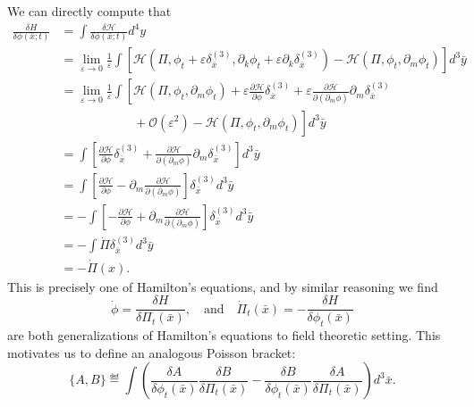 We can directly compute that
\begin{subequations}
\begin{align}
\frac{\delta H}{\delta\phi(\bar{x};t)} &= \int \frac{\delta\mathcal{H}}{\delta\phi(\bar{x};t)}d^{4}y\\
&= \lim_{\varepsilon\to0}\frac{1}{\varepsilon}\int\left[\mathcal{H}(\Pi,\phi_{t}+\varepsilon\delta^{(3)}_{\bar{x}},\partial_{k}\phi_{t}+\varepsilon\partial_{k}\delta^{(3)}_{\bar{x}})-\mathcal{H}(\Pi,\phi_{t},\partial_{m}\phi_{t})\right]d^{3}\bar{y}\\
&=\lim_{\varepsilon\to0}\frac{1}{\varepsilon}\int\left[\mathcal{H}(\Pi,\phi_{t},\partial_{m}\phi_{t})+\varepsilon\frac{\partial\mathcal{H}}{\partial\phi}\delta_{\bar{x}}^{(3)}+\varepsilon\frac{\partial\mathcal{H}}{\partial(\partial_{m}\phi)}\partial_{m}\delta_{\bar{x}}^{(3)}\right.\\\nonumber
&\left.\phantom{\lim_{\varepsilon\to0}\frac{1}{\varepsilon}\int\qquad}
+\mathcal{O}(\varepsilon^{2})-\mathcal{H}(\Pi,\phi_{t},\partial_{m}\phi_{t})\right]d^{3}\bar{y}\\
&=\int\left[\frac{\partial\mathcal{H}}{\partial\phi}\delta^{(3)}_{\bar{x}}+\frac{\partial\mathcal{H}}{\partial(\partial_{m}\phi)}\partial_{m}\delta^{(3)}_{\bar{x}}\right]d^{3}\bar{y}\\
&=\int\left[\frac{\partial\mathcal{H}}{\partial\phi}-\partial_{m}\frac{\partial\mathcal{H}}{\partial(\partial_{m}\phi)}\right]\delta^{(3)}_{\bar{x}}d^{3}\bar{y}\\
&=-\int\left[-\frac{\partial\mathcal{H}}{\partial\phi}+\partial_{m}\frac{\partial\mathcal{H}}{\partial(\partial_{m}\phi)}\right]\delta^{(3)}_{\bar{x}}d^{3}\bar{y}\\
&=-\int\dot{\Pi}\delta^{(3)}_{\bar{x}}d^{3}\bar{y}\\
&=-\dot{\Pi}(x).
\end{align}
\end{subequations}
This is precisely one of Hamilton's equations, and by similar
reasoning we find
\begin{equation}%
\dot{\phi} = \frac{\delta
  H}{\delta\Pi_{t}(\bar{x})},\quad\text{and}\quad\dot{\Pi}_{t}(\bar{x})=-\frac{\delta H}{\delta\phi_{t}(\bar{x})}
\end{equation}
are both generalizations of Hamilton's equations to field
theoretic setting. This motivates us to define an analogous
Poisson bracket:
\begin{equation}%
\{A,B\}\eqdef\int\left(\frac{\delta A}{\delta\phi_{t}(\bar{x})}\frac{\delta B}{\delta\Pi_{t}(\bar{x})}-\frac{\delta B}{\delta\phi_{t}(\bar{x})}\frac{\delta A}{\delta\Pi_{t}(\bar{x})}\right)d^{3}\bar{x}.
\end{equation}
